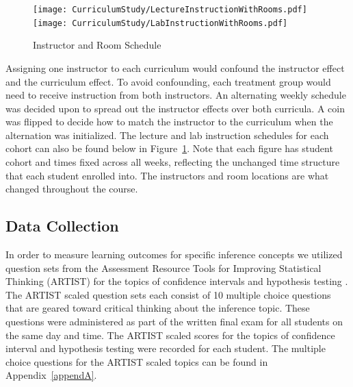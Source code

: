 \begin{figure}[hbtp]
\centering
\texttt{[image: CurriculumStudy/LectureInstructionWithRooms.pdf]}\\
\vspace{.5cm}
\texttt{[image: CurriculumStudy/LabInstructionWithRooms.pdf]}
\caption{\label{fig:InstSched} Instructor and Room Schedule}
\end{figure}


Assigning one instructor to each curriculum would confound the instructor effect and the curriculum effect.  To avoid confounding, each treatment group would need to receive instruction from both instructors.  An alternating weekly schedule was decided upon to spread out the instructor effects over both curricula. A coin was flipped to decide how to match the instructor to the curriculum when the alternation was initialized. The lecture and lab instruction schedules for each cohort can also be found below in Figure~\ref{fig:InstSched}. Note that each figure has student cohort and times fixed across all weeks, reflecting the unchanged time structure that each student enrolled into. The instructors and room locations are what changed throughout the course. 

\subsection{Data Collection}
\label{datacollect}

In order to measure learning outcomes for specific inference concepts we utilized question sets from the Assessment Resource Tools for Improving Statistical Thinking (ARTIST) for the topics of confidence intervals and hypothesis testing \citep{ARTIST}.  The ARTIST scaled question sets each consist of 10 multiple choice questions that are geared toward critical thinking about the inference topic.  These questions were administered as part of the written final exam for all students on the same day and time. The ARTIST scaled scores for the topics of confidence interval and hypothesis testing were recorded for each student. The multiple choice questions for the ARTIST scaled topics can be found in Appendix~\ref{appendA}.

